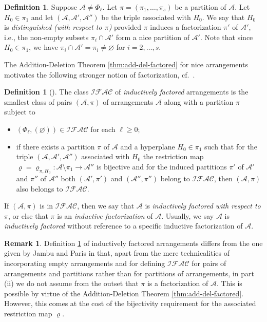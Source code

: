 \documentclass[12pt]{amsart}
\newcommand\CA{{\mathscr A}}
\newcommand\CIFAC{{\mathcal {IF\!AC}}}
\newcommand\R{{\varrho}}
\numberwithin{equation}{section}
\theoremstyle{plain}
\theoremstyle{definition}
\newtheorem{defn}[equation]{Definition}
\newtheorem{remark}[equation]{Remark}
\begin{document}
\begin{defn}
	\label{def:distinguished}
	Suppose $\CA \ne \Phi_\ell$. 
	Let $\pi = (\pi_1, \ldots, \pi_s)$ be a partition of $\CA$.
	Let $H_0 \in \pi_1$ and
	let $(\CA, \CA', \CA'')$ be the triple associated with $H_0$.
	We say that $H_0$ is \emph{distinguished (with respect to $\pi$)}
	provided $\pi$ induces a factorization $\pi'$ of
	$\CA'$, i.e., the non-empty
	subsets $\pi_i \cap \CA'$ form a nice partition
	of $\CA'$. Note that since $H_0 \in \pi_1$, we have
	$\pi_i \cap \CA' = \pi_i\not= \varnothing$
	for $i = 2, \ldots, s$.
\end{defn}

The Addition-Deletion Theorem \ref{thm:add-del-factored}
for nice arrangements motivates
the following stronger notion of factorization,
cf.\ \cite{jambuparis:factored}.

\begin{defn} [{\cite[Def.~3.8]{hogeroehrle:factored}}]
	\label{def:indfactored}
	The class $\CIFAC$ of \emph{inductively factored} arrangements
	is the smallest class of pairs $(\CA, \pi)$ of
	arrangements $\CA$ along with a partition $\pi$
	subject to
	\begin{itemize}
		\item[(i)] $(\Phi_\ell, (\varnothing)) \in \CIFAC$ for each $\ell \ge 0$;
		\item[(ii)] if there exists a partition $\pi$ of $\CA$
		and a hyperplane $H_0 \in \pi_1$ such that
		for the triple $(\CA, \CA', \CA'')$ associated with $H_0$
		the restriction map $\R = \R_{\pi, H_0} : \CA \setminus \pi_1 \to \CA''$
		is bijective and for the induced partitions $\pi'$ of $\CA'$ and
		$\pi''$ of $\CA''$
		both $(\CA', \pi')$ and $(\CA'', \pi'')$ belong to $\CIFAC$,
		then $(\CA, \pi)$ also belongs to $\CIFAC$.
	\end{itemize}
	If $(\CA, \pi)$ is in $\CIFAC$, then we say that
	$\CA$ is \emph{inductively factored with respect to $\pi$}, or else
	that $\pi$ is an \emph{inductive factorization} of $\CA$.
	Usually, we say $\CA$ is \emph{inductively factored} without
	reference to a specific inductive factorization of $\CA$.
\end{defn}

\begin{remark}
	Definition \ref{def:indfactored}
	of inductively factored arrangements
	differs from the one given by
	Jambu and Paris \cite{jambuparis:factored}
	in that, apart from the mere technicalities of
	incorporating empty arrangements and for defining
	$\CIFAC$ for pairs of arrangements and partitions
	rather than for partitions of arrangements,
	in part (ii) we do not assume from the outset
	that $\pi$ is a factorization of $\CA$.
	This is possible by virtue of
	the Addition-Deletion Theorem \ref{thm:add-del-factored}.
	However, this comes at the cost of
	the bijectivity requirement for the associated restriction map $\R$.
\end{remark}
\end{document}
